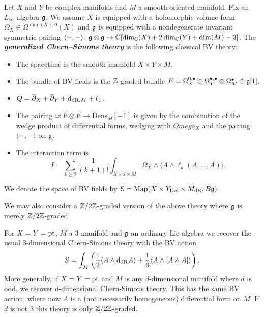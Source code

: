 \documentclass[10pt, oneside]{article}
\newcommand{\Dens}{\mathrm{Dens}}
\newcommand{\defterm}[1]{\textbf{\emph{#1}}}
\begin{document}
\begin{definition}
Let $X$ and $Y$ be complex manifolds and $M$ a smooth oriented manifold. Fix an $L_\infty$ algebra $\mathfrak g$. We assume $X$ is equipped with a holomorphic volume form $\Omega_X \in\Omega^{\dim(X), 0}(X)$ and $\mathfrak g$ is equipped with a nondegenerate invariant symmetric pairing $\langle-, -\rangle\colon \mathfrak g\otimes\mathfrak g\rightarrow \mathbb C[\dim_\mathbb C(X) + 2\dim_\mathbb C(Y) + \dim(M) - 3]$. The \defterm{generalized Chern--Simons theory} is the following classical BV theory:
\begin{itemize}
\item The spacetime is the smooth manifold $X\times Y\times M$.

\item The bundle of BV fields is the $\mathbb Z$-graded bundle $E = \Omega^{0,\bullet}_X \otimes \Omega^{\bullet,\bullet}_Y \otimes \Omega^\bullet_M \otimes \mathfrak g[1]$.

\item $Q = \overline{\partial}_X + \overline{\partial}_Y + {\rm d}_{\mathrm{dR}, M} + \ell_1$.

\item The pairing $\omega\colon E\otimes E\rightarrow \Dens_M[-1]$ is given by the combination of the wedge product of differential forms, wedging with $Omega_X$ and the pairing $\langle -, -\rangle$ on $\mathfrak g$.

\item The interaction term is
\[I = \sum_{k\geq 2}\frac{1}{(k+1)!} \int_{X\times Y\times M} \Omega_X\wedge \langle A\wedge \ell_k(A, \dots, A)\rangle.\]
\end{itemize}
We denote the space of BV fields by $\mathcal E = \operatorname{Map}(X\times Y_{\mathrm{Dol}}\times M_{\mathrm{dR}}, B \mathfrak g)$.
\label{def:generalizedCS}
\end{definition}

We may also consider a $\mathbb Z/2\mathbb Z$-graded version of the above theory where $\mathfrak g$ is merely $\mathbb Z/2\mathbb Z$-graded.

\begin{example}
For $X=Y=\operatorname{pt}$, $M$ a 3-manifold and $\mathfrak g$ an ordinary Lie algebra we recover the usual 3-dimensional Chern-Simons theory with the BV action
\[S = \int_M \left(\frac{1}{2}\langle A\wedge {\rm d}_{\mathrm{dR}} A\rangle + \frac{1}{6}\langle A\wedge [A\wedge A]\rangle\right).\]
More generally, if $X=Y=\operatorname{pt}$ and $M$ is any $d$-dimensional manifold where $d$ is odd, we recover $d$-dimensional Chern-Simons theory.  This has the same BV action, where now $A$ is a (not necessarily homogeneous) differential form on $M$.  If $d$ is not 3 this theory is only $\mathbb Z/2\mathbb Z$-graded.
\end{example}
\end{document}
